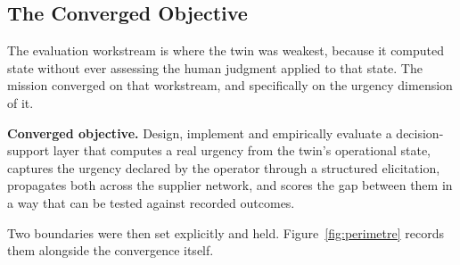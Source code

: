 \subsection{The Converged Objective}
\label{sec:mission_perimetre}

The evaluation workstream is where the twin was weakest, because it computed state without
ever assessing the human judgment applied to that state. The mission converged on that
workstream, and specifically on the urgency dimension of it.

\begin{definitionBox}
\noindent\textbf{Converged objective.} Design, implement and empirically evaluate a
decision-support layer that computes a real urgency from the twin's operational state,
captures the urgency declared by the operator through a structured elicitation, propagates
both across the supplier network, and scores the gap between them in a way that can be
tested against recorded outcomes.
\end{definitionBox}

Two boundaries were then set explicitly and held. Figure~\ref{fig:perimetre} records them
alongside the convergence itself.

